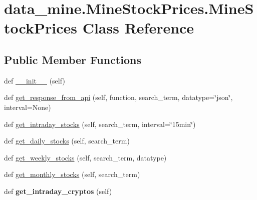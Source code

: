 \hypertarget{classdata__mine_1_1_mine_stock_prices_1_1_mine_stock_prices}{}\section{data\+\_\+mine.\+Mine\+Stock\+Prices.\+Mine\+Stock\+Prices Class Reference}
\label{classdata__mine_1_1_mine_stock_prices_1_1_mine_stock_prices}
\subsection*{Public Member Functions}
\begin{DoxyCompactItemize}
\item 
def \mbox{\hyperlink{classdata__mine_1_1_mine_stock_prices_1_1_mine_stock_prices_a9451b88181645b907f525b9ed63f65b0}{\+\_\+\+\_\+init\+\_\+\+\_\+}} (self)
\item 
def \mbox{\hyperlink{classdata__mine_1_1_mine_stock_prices_1_1_mine_stock_prices_a079e6738aef24fb09b5c23a1b97e97f4}{get\+\_\+response\+\_\+from\+\_\+api}} (self, function, search\+\_\+term, datatype=\char`\"{}json\char`\"{}, interval=None)
\item 
def \mbox{\hyperlink{classdata__mine_1_1_mine_stock_prices_1_1_mine_stock_prices_a9b73eb16d981aa9ebb8f2bdfbd3084cc}{get\+\_\+intraday\+\_\+stocks}} (self, search\+\_\+term, interval=\char`\"{}15min\char`\"{})
\item 
def \mbox{\hyperlink{classdata__mine_1_1_mine_stock_prices_1_1_mine_stock_prices_a4b892c0fb91e6bfd57e58bd0afae29f0}{get\+\_\+daily\+\_\+stocks}} (self, search\+\_\+term)
\item 
def \mbox{\hyperlink{classdata__mine_1_1_mine_stock_prices_1_1_mine_stock_prices_a98f05c73f0e1d30d16d42eb7510d60de}{get\+\_\+weekly\+\_\+stocks}} (self, search\+\_\+term, datatype)
\item 
def \mbox{\hyperlink{classdata__mine_1_1_mine_stock_prices_1_1_mine_stock_prices_a4e1c7514206e1ea659893e630a3e3ce7}{get\+\_\+monthly\+\_\+stocks}} (self, search\+\_\+term)
\item 
\mbox{\label{classdata__mine_1_1_mine_stock_prices_1_1_mine_stock_prices_a6ed118f8260ea93e1c4667f725b53855}} 
def {\bfseries get\+\_\+intraday\+\_\+cryptos} (self)
\item 
\mbox{\label{classdata__mine_1_1_mine_stock_prices_1_1_mine_stock_prices_a11108962a4b8b0c1853d4887e9d0d485}} 

\end{DoxyCompactItemize}
